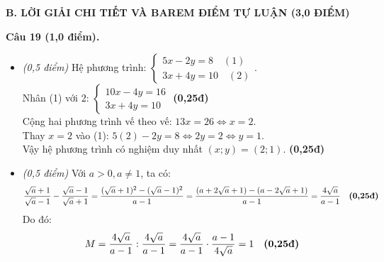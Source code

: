 \documentclass[11pt,a4paper]{article}
\begin{document}
\vspace{2mm}
\noindent
\textbf{\large B. LỜI GIẢI CHI TIẾT VÀ BAREM ĐIỂM TỰ LUẬN (3,0 ĐIỂM)}

\vspace{1.5mm}
\noindent
\textbf{Câu 19 (1,0 điểm).}
\begin{itemize}
  \item[a)] \textit{(0,5 điểm)} Hệ phương trình: $\begin{cases} 5x - 2y = 8 \quad (1) \\ 3x + 4y = 10 \quad (2) \end{cases}$.\\
  Nhân (1) với 2: $\begin{cases} 10x - 4y = 16 \\ 3x + 4y = 10 \end{cases}$ \dotfill \textbf{(0,25đ)}\\
  Cộng hai phương trình vế theo vế: $13x = 26 \iff x = 2$.\\
  Thay $x = 2$ vào (1): $5(2) - 2y = 8 \iff 2y = 2 \iff y = 1$.\\
  Vậy hệ phương trình có nghiệm duy nhất $(x; y) = (2; 1)$. \dotfill \textbf{(0,25đ)}

  \item[b)] \textit{(0,5 điểm)} Với $a > 0, a \ne 1$, ta có:
  \[
  \dfrac{\sqrt{a}+1}{\sqrt{a}-1} - \dfrac{\sqrt{a}-1}{\sqrt{a}+1} = \dfrac{(\sqrt{a}+1)^2 - (\sqrt{a}-1)^2}{a - 1} = \dfrac{(a + 2\sqrt{a} + 1) - (a - 2\sqrt{a} + 1)}{a - 1} = \dfrac{4\sqrt{a}}{a - 1} \quad \text{\textbf{(0,25đ)}}
  \]
  Do đó:
  \[
  M = \dfrac{4\sqrt{a}}{a - 1} : \dfrac{4\sqrt{a}}{a - 1} = \dfrac{4\sqrt{a}}{a - 1} \cdot \dfrac{a - 1}{4\sqrt{a}} = 1 \quad \text{\textbf{(0,25đ)}}
  \]
\end{itemize}
\end{document}

